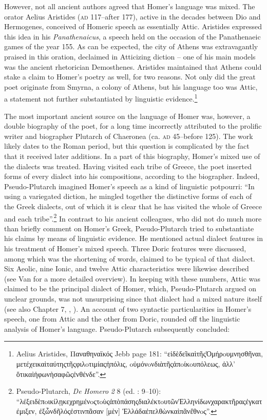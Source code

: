 However, not all ancient authors agreed that Homer’s language was mixed. The orator Aelius Aristides (\textsc{ad} 117–after 177), active in the decades between Dio and Hermogenes, conceived of Homeric speech as essentially Attic. Aristides expressed this idea in his \textit{Panathenaicus}, a speech held on the occasion of the Panathenaeic games of the year 155. As can be expected, the city of Athens was extravagantly praised in this oration, declaimed in Atticizing diction – one of his main models was the ancient rhetorician Demosthenes. Aristides maintained that Athens could stake a claim to Homer’s poetry as well, for two reasons. Not only did the great poet originate from Smyrna, a colony of Athens, but his language too was Attic, a statement not further substantiated by linguistic evidence.\footnote{Aelius Aristides, Παναθηναϊκός Jebb page 181: “εἰδὲδεῖκαὶτῆςὉμήρoυμνησθῆναι, μετέχεικαὶταύτηςτῆςφιλoτιμίαςἡπόλις, oὐμόνoνδιὰτῆςἀπoίκoυπόλεως, ἀλλ’ ὅτικαὶἡφωνὴσαφῶςἐνθένδε”.}

The most important ancient source on the language of Homer was, however, a double biography of the poet, for a long time incorrectly attributed to the prolific writer and biographer Plutarch of Chaeronea (ca. \textsc{ad} 45–before 125). The work likely dates to the Roman period, but this question is complicated by the fact that it received later additions. In a part of this biography, Homer’s mixed use of the dialects was treated. Having visited each tribe of Greece, the poet inserted forms of every dialect into his compositions, according to the biographer. Indeed, Pseudo-Plutarch imagined Homer’s speech as a kind of linguistic potpourri: “In using a variegated diction, he mingled together the distinctive forms of each of the Greek dialects, out of which it is clear that he has visited the whole of Greece and each tribe”.\footnote{Pseudo-Plutarch, \textit{De} \textit{Homero} \textit{2} 8 (ed. \citealt{Kindstrand1990}: 9–10): “λέξειδὲπoικίλῃκεχρημένoςτoὺςἀπὸπάσηςδιαλέκτoυτῶνἙλληνίδωνχαρακτῆραςἐγκατέμιξεν, ἐξὧνδῆλόςἐστινπᾶσαν [μὲν] Ἑλλάδαἐπελθὼνκαὶπᾶνἔθνoς”.} In contrast to his ancient colleagues, who did not do much more than briefly comment on Homer’s Greek, Pseudo-Plutarch tried to substantiate his claims by means of linguistic evidence. He mentioned actual dialect features in his treatment of Homer’s mixed speech. Three Doric features were discussed, among which was the shortening of words, claimed to be typical of that dialect. Six Aeolic, nine Ionic, and twelve Attic characteristics were likewise described (see Van \citealt{Rooy2018c} for a more detailed overview). In keeping with these numbers, Attic was claimed to be the principal dialect of Homer, which, Pseudo-Plutarch argued on unclear grounds, was not unsurprising since that dialect had a mixed nature itself (see also Chapter 7, , ). An account of two syntactic particularities in Homer’s speech, one from Attic and the other from Doric, rounded off the linguistic analysis of Homer’s language. Pseudo-Plutarch subsequently concluded:

